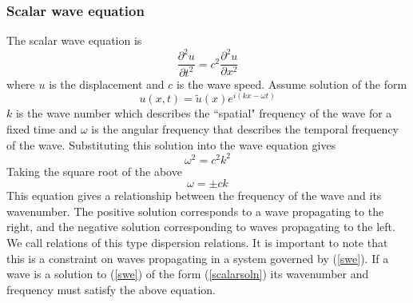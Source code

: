 \documentclass{article}
\begin{document}
\subsubsection{Scalar wave equation}
The scalar wave equation is 
\begin{equation} \label{swe}
\frac{\partial^2 u}{\partial t^2} = c^2 \frac{\partial^2 u}{\partial x^2}
\end{equation}
where $u$ is the displacement and $c$ is the wave speed. Assume solution of 
the form
\begin{equation} \label{scalarsoln}
u(x,t) = \tilde{u}(x)e^{i(kx - \omega t)}
\end{equation}
$k$ is the wave number which describes the ``spatial" frequency of 
the wave for a fixed time and $\omega$ is the angular frequency that describes 
the temporal frequency of the wave. Substituting this solution into the wave 
equation gives
\begin{equation}
\omega^2 = c^2 k^2
\end{equation}
Taking the square root of the above
\begin{equation} \label{nd}
\omega = \pm c k
\end{equation}
This equation gives a relationship between the frequency of the wave and its 
wavenumber. The positive solution corresponds to a wave propagating to the 
right, and the negative solution corresponding to waves propagating to the 
left. We call relations of this type dispersion relations. It is 
important to note that this is a constraint on waves propagating in a system 
governed by (\ref{swe}). If a wave is a solution to (\ref{swe}) of the form 
(\ref{scalarsoln}) its wavenumber and frequency must satisfy the above equation.
\end{document}
